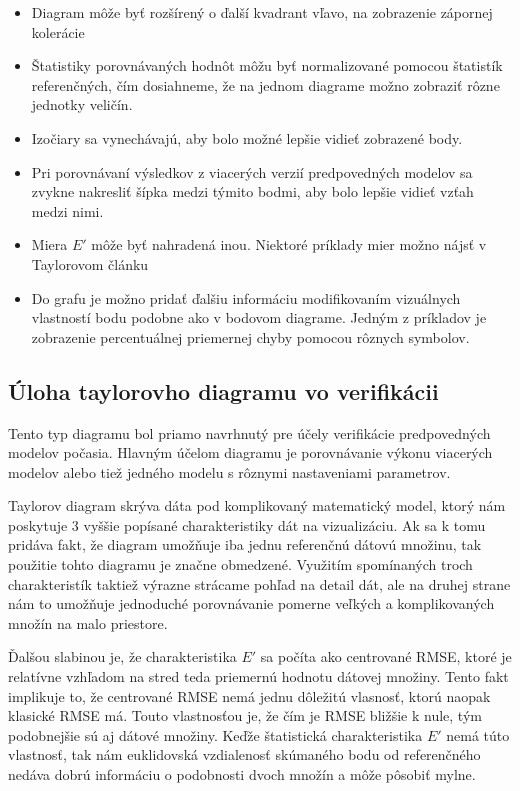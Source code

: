 \begin{singlespacing}
\begin{itemize} 
	\item Diagram môže byť rozšírený o ďalší kvadrant vľavo, na zobrazenie zápornej kolerácie 
	\item Štatistiky porovnávaných hodnôt môžu byť normalizované pomocou štatistík referenčných, čím dosiahneme, že na jednom diagrame možno zobraziť rôzne jednotky veličín.
	\item Izočiary sa vynechávajú, aby bolo možné lepšie vidieť zobrazené body.
	\item Pri porovnávaní výsledkov z viacerých verzií predpovedných modelov sa zvykne nakresliť šípka medzi týmito bodmi, aby bolo lepšie vidieť vzťah medzi nimi.
	\item Miera $ E' $ môže byť nahradená inou. Niektoré príklady mier možno nájsť v Taylorovom článku \cite{Taylor}
	\item Do grafu je možno pridať ďalšiu informáciu modifikovaním vizuálnych vlastností bodu podobne ako v bodovom diagrame. Jedným z príkladov je zobrazenie percentuálnej priemernej chyby pomocou rôznych symbolov.
\end{itemize}
\end{singlespacing}



\subsection{Úloha taylorovho diagramu vo verifikácii}
Tento typ diagramu bol priamo navrhnutý pre účely verifikácie predpovedných modelov počasia. Hlavným účelom diagramu je porovnávanie výkonu viacerých modelov alebo tiež jedného modelu s rôznymi nastaveniami parametrov. 

Taylorov diagram skrýva dáta pod komplikovaný matematický model, ktorý nám poskytuje 3 vyššie popísané charakteristiky dát na vizualizáciu. Ak sa k tomu pridáva fakt, že diagram umožňuje iba jednu referenčnú dátovú množinu, tak použitie tohto diagramu je značne obmedzené. Využitím spomínaných troch charakteristík taktiež výrazne strácame pohľad na detail dát, ale na druhej strane nám to umožňuje jednoduché porovnávanie pomerne veľkých a komplikovaných množín na malo priestore. 

Ďalšou slabinou je, že charakteristika $ E' $ sa počíta ako centrované RMSE, ktoré je relatívne vzhľadom na stred teda priemernú hodnotu dátovej množiny. Tento fakt implikuje to, že centrované RMSE nemá jednu dôležitú vlasnosť, ktorú naopak klasické RMSE má. Touto vlastnosťou je, že čím je RMSE bližšie k nule, tým podobnejšie sú aj dátové množiny. Keďže štatistická charakteristika $ E' $ nemá túto vlastnosť, tak nám euklidovská vzdialenosť skúmaného bodu od referenčného nedáva dobrú informáciu o podobnosti dvoch množín a môže pôsobiť mylne.